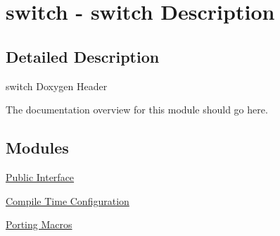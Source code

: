 \hypertarget{group__switch}{\section{switch -\/ switch Description}
\label{group__switch}
}


\subsection{Detailed Description}
switch Doxygen Header

The documentation overview for this module should go here. \subsection*{Modules}
\begin{DoxyCompactItemize}
\item 
\hyperlink{group__switch-switch}{Public Interface}
\item 
\hyperlink{group__switch-config}{Compile Time Configuration}
\item 
\hyperlink{group__switch-porting}{Porting Macros}
\end{DoxyCompactItemize}
